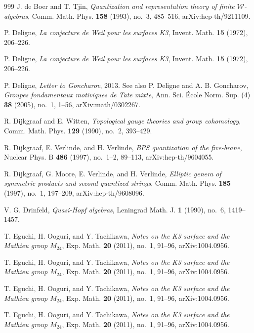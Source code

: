 \begin{thebibliography}{999}
J. de Boer and T. Tjin, \emph{Quantization and representation theory of finite $\mathcal W$-algebras}, Comm. Math. Phys. \textbf{158} (1993), no.~3, 485--516, arXiv:hep-th/9211109.

P. Deligne, \emph{La conjecture de Weil pour les surfaces K3}, Invent. Math. \textbf{15} (1972), 206--226.

P. Deligne, \emph{La conjecture de Weil pour les surfaces K3}, Invent. Math. \textbf{15} (1972), 206--226.

P. Deligne, \emph{Letter to Goncharov}, 2013. See also P. Deligne and A. B. Goncharov, \emph{Groupes fondamentaux motiviques de Tate mixte}, Ann. Sci. \'Ecole Norm. Sup. (4) \textbf{38} (2005), no.~1, 1--56, arXiv:math/0302267.

R. Dijkgraaf and E. Witten, \emph{Topological gauge theories and group cohomology}, Comm. Math. Phys. \textbf{129} (1990), no.~2, 393--429.

R. Dijkgraaf, E. Verlinde, and H. Verlinde, \emph{BPS quantization of the five-brane}, Nuclear Phys. B \textbf{486} (1997), no.~1--2, 89--113, arXiv:hep-th/9604055.

R. Dijkgraaf, G. Moore, E. Verlinde, and H. Verlinde, \emph{Elliptic genera of symmetric products and second quantized strings}, Comm. Math. Phys. \textbf{185} (1997), no.~1, 197--209, arXiv:hep-th/9608096.

V. G. Drinfeld, \emph{Quasi-Hopf algebras}, Leningrad Math. J. \textbf{1} (1990), no.~6, 1419--1457.

T. Eguchi, H. Ooguri, and Y. Tachikawa, \emph{Notes on the K3 surface and the Mathieu group $M_{24}$}, Exp. Math. \textbf{20} (2011), no.~1, 91--96, arXiv:1004.0956.

T. Eguchi, H. Ooguri, and Y. Tachikawa, \emph{Notes on the K3 surface and the Mathieu group $M_{24}$}, Exp. Math. \textbf{20} (2011), no.~1, 91--96, arXiv:1004.0956.

T. Eguchi, H. Ooguri, and Y. Tachikawa, \emph{Notes on the K3 surface and the Mathieu group $M_{24}$}, Exp. Math. \textbf{20} (2011), no.~1, 91--96, arXiv:1004.0956.

T. Eguchi, H. Ooguri, and Y. Tachikawa, \emph{Notes on the K3 surface and the Mathieu group $M_{24}$}, Exp. Math. \textbf{20} (2011), no.~1, 91--96, arXiv:1004.0956.


\end{thebibliography}
